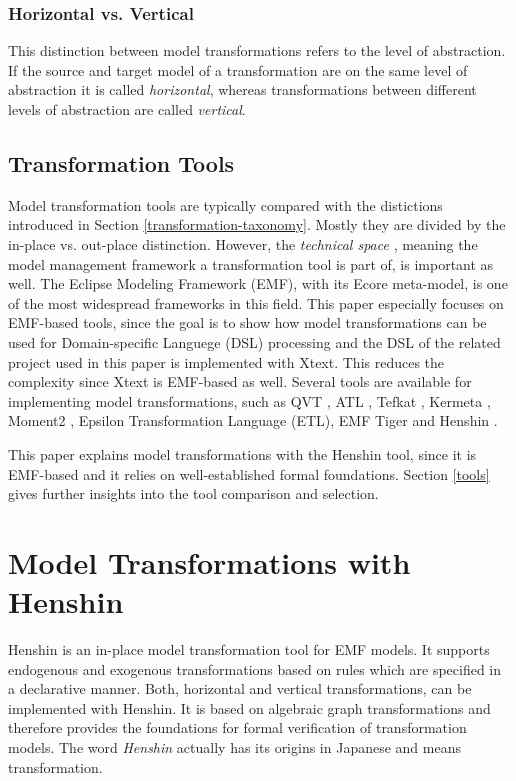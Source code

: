 \documentclass[runningheads]{llncs}
\begin{document}
\subsubsection{Horizontal vs. Vertical}
This distinction between model transformations refers to the level of abstraction. If the source and target model of a transformation are on the same level of abstraction it is called \textit{horizontal}, whereas transformations between different levels of abstraction are called \textit{vertical}.

\subsection{Transformation Tools}
Model transformation tools are typically compared with the distictions introduced in Section \ref{transformation-taxonomy}. Mostly they are divided by the in-place vs. out-place distinction. However, the \textit{technical space} \cite{MENS2006125}, meaning the model management framework a transformation tool is part of, is important as well. The Eclipse Modeling Framework (EMF)\cite{steinberg2008emf}, with its Ecore meta-model, is one of the most widespread frameworks in this field. This paper especially focuses on EMF-based tools, since the goal is to show how model transformations can be used for Domain-specific Languege (DSL) processing and the DSL of the related project used in this paper is implemented with Xtext. This reduces the complexity since Xtext is EMF-based as well. Several tools are available for implementing model transformations, such as QVT \cite{qvt}, ATL \cite{atl}, Tefkat \cite{tefkat}, Kermeta \cite{kermeta}, Moment2 \cite{moment2}, Epsilon Transformation Language (ETL)\cite{etl}, EMF Tiger \cite{emf-tiger} and Henshin \cite{Arendt:2010:HAC:1926458.1926471}. 

This paper explains model transformations with the Henshin tool, since it is EMF-based and it relies on well-established formal foundations. Section \ref{tools} gives further insights into the tool comparison and selection.

\section{Model Transformations with Henshin}
Henshin \cite{Arendt:2010:HAC:1926458.1926471} is an in-place model transformation tool for EMF models. It supports endogenous and exogenous transformations based on rules which are specified in a declarative manner. Both, horizontal and vertical transformations, can be implemented with Henshin. It is based on algebraic graph transformations and therefore provides the foundations for formal verification of transformation models. The word \textit{Henshin} actually has its origins in Japanese and means transformation.
\end{document}
